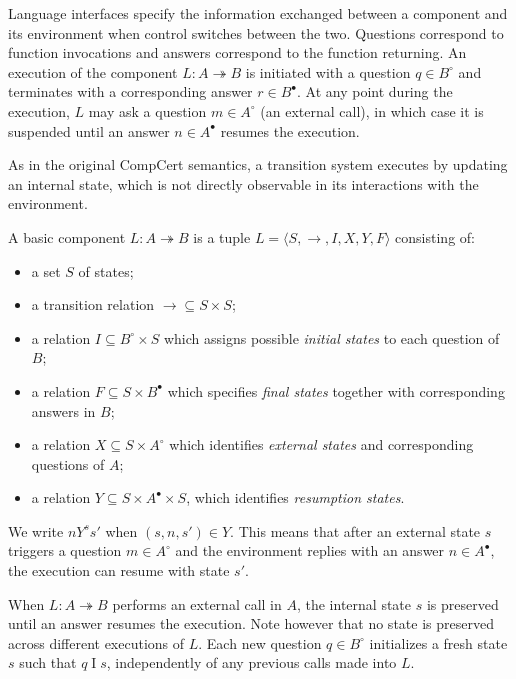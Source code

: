 \documentclass[acmsmall,screen,review,anonymous]{acmart}
\newcommand{\que}{\circ}
\newcommand{\ans}{\bullet}
\begin{document}
Language interfaces specify the information exchanged between
a component and its environment
when control switches between the two.
Questions correspond to function invocations
and answers correspond to the function returning.
An execution of the component $L : A \twoheadrightarrow B$
is initiated with a question $q \in B^\que$
and terminates with a corresponding answer $r \in B^\ans$.
At any point during the execution,
$L$ may ask a question $m \in A^\que$ (an external call),
in which case it is suspended until an answer $n \in A^\ans$
resumes the execution.

As in the original CompCert semantics,
a transition system
executes by updating an internal state,
which is not directly observable
in its interactions with the environment.

\begin{definition} \label{def:lts} %
A basic component $L : A \twoheadrightarrow B$
is a tuple $L = \langle S, {\rightarrow}, I, X, Y, F \rangle$
consisting of:
\begin{itemize}
  \item a set $S$ of states;
  \item a transition relation ${\rightarrow} \subseteq S \times S$;
  \item a relation $I \subseteq B^\que \times S$
    which assigns possible \emph{initial states}
    to each question of $B$;
  \item a relation $F \subseteq S \times B^\ans$
    which specifies \emph{final states} together with
    corresponding answers in $B$;
  \item a relation $X \subseteq S \times A^\que$
    which identifies \emph{external states} and
    corresponding questions of $A$;
  \item a relation $Y \subseteq S \times A^\ans \times S$,
    which identifies \emph{resumption states}.
\end{itemize}
We write $n \mathrel{Y^s} s'$ when $(s, n, s') \in Y$.
This means that
after an external state $s$ triggers a question $m \in A^\que$ %
and the environment replies with an answer $n \in A^\ans$,
the execution can resume with state $s'$.
\end{definition}

When $L : A \twoheadrightarrow B$
performs an external call in $A$,
the internal state $s$ is preserved
until an answer resumes the execution.
Note however that
no state is preserved across different executions of $L$.
Each new question $q \in B^\que$ initializes a fresh state $s$
such that $q \mathrel{I} s$,
independently of any previous calls made into $L$.
\end{document}
